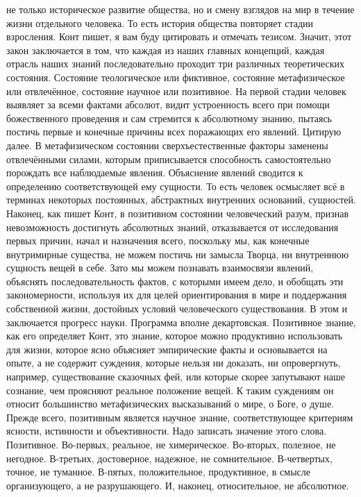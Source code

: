 не только историческое развитие общества, но и смену взглядов на мир в течение
жизни отдельного человека. То есть история общества повторяет стадии взросления.
Конт пишет, я вам буду цитировать и отмечать тезисом. Значит, этот закон
заключается в том, что каждая из наших главных концепций, каждая отрасль наших
знаний последовательно проходит три различных теоретических состояния. Состояние
теологическое или фиктивное, состояние метафизическое или отвлечённое, состояние
научное или позитивное. На первой стадии человек выявляет за всеми фактами
абсолют, видит устроенность всего при помощи божественного проведения и сам
стремится к абсолютному знанию, пытаясь постичь первые и конечные причины всех
поражающих его явлений. Цитирую далее. В метафизическом состоянии
сверхъестественные факторы заменены отвлечёнными силами, которым приписывается
способность самостоятельно порождать все наблюдаемые явления. Объяснение явлений
сводится к определению соответствующей ему сущности. То есть человек осмысляет
всё в терминах некоторых постоянных, абстрактных внутренних оснований,
сущностей. Наконец, как пишет Конт, в позитивном состоянии человеческий разум,
признав невозможность достигнуть абсолютных знаний, отказывается от исследования
первых причин, начал и назначения всего, поскольку мы, как конечные внутримирные
существа, не можем постичь ни замысла Творца, ни внутреннюю сущность вещей в
себе. Зато мы можем познавать взаимосвязи явлений, объяснять последовательность
фактов, с которыми имеем дело, и обобщать эти закономерности, используя их для
целей ориентирования в мире и поддержания собственной жизни, достойных условий
человеческого существования. В этом и заключается прогресс науки. Программа
вполне декартовская. Позитивное знание, как его определяет Конт, это знание,
которое можно продуктивно использовать для жизни, которое ясно объясняет
эмпирические факты и основывается на опыте, а не содержит суждения, которые
нельзя ни доказать, ни опровергнуть, например, существование сказочных фей, или
которые скорее запутывают наше сознание, чем проясняют реальное положение вещей.
К таким суждениям он относит большинство метафизических высказываний о мире, о
Боге, о душе. Прежде всего, позитивным является научное знание, соответствующее
критериям ясности, истинности и объективности. Надо записать значение этого
слова. Позитивное. Во-первых, реальное, не химерическое. Во-вторых, полезное, не
негодное. В-третьих, достоверное, надежное, не сомнительное. В-четвертых,
точное, не туманное. В-пятых, положительное, продуктивное, в смысле
организующего, а не разрушающего. И, наконец, относительное, не абсолютное.

